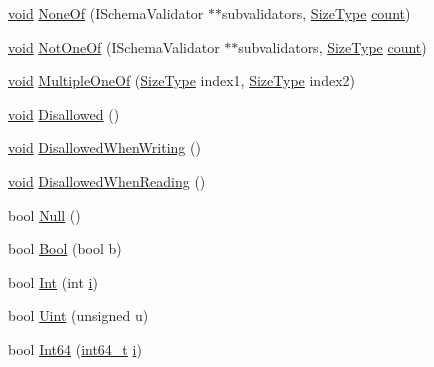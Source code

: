 \begin{DoxyCompactItemize}
\hyperlink{imgui__impl__opengl3__loader_8h_ac668e7cffd9e2e9cfee428b9b2f34fa7}{void} \hyperlink{classGenericSchemaValidator_aae9c45082721c650b91f8418cecc7293}{None\+Of} (I\+Schema\+Validator $\ast$$\ast$subvalidators, \hyperlink{rapidjson_8h_a5ed6e6e67250fadbd041127e6386dcb5}{Size\+Type} \hyperlink{imgui__impl__opengl3__loader_8h_a619bc20e8198de3bd3f3d7fc34de66b2}{count})
\item 
\hyperlink{imgui__impl__opengl3__loader_8h_ac668e7cffd9e2e9cfee428b9b2f34fa7}{void} \hyperlink{classGenericSchemaValidator_ad4819a91a42d781391760f26014cd315}{Not\+One\+Of} (I\+Schema\+Validator $\ast$$\ast$subvalidators, \hyperlink{rapidjson_8h_a5ed6e6e67250fadbd041127e6386dcb5}{Size\+Type} \hyperlink{imgui__impl__opengl3__loader_8h_a619bc20e8198de3bd3f3d7fc34de66b2}{count})
\item 
\hyperlink{imgui__impl__opengl3__loader_8h_ac668e7cffd9e2e9cfee428b9b2f34fa7}{void} \hyperlink{classGenericSchemaValidator_a53c37b0dba5f2ca79d2c7c13488e5ffd}{Multiple\+One\+Of} (\hyperlink{rapidjson_8h_a5ed6e6e67250fadbd041127e6386dcb5}{Size\+Type} index1, \hyperlink{rapidjson_8h_a5ed6e6e67250fadbd041127e6386dcb5}{Size\+Type} index2)
\item 
\hyperlink{imgui__impl__opengl3__loader_8h_ac668e7cffd9e2e9cfee428b9b2f34fa7}{void} \hyperlink{classGenericSchemaValidator_acc65a322086c792d6534e306c7a091cf}{Disallowed} ()
\item 
\hyperlink{imgui__impl__opengl3__loader_8h_ac668e7cffd9e2e9cfee428b9b2f34fa7}{void} \hyperlink{classGenericSchemaValidator_aa66173c9e71ed6143fa2b35ce777f36a}{Disallowed\+When\+Writing} ()
\item 
\hyperlink{imgui__impl__opengl3__loader_8h_ac668e7cffd9e2e9cfee428b9b2f34fa7}{void} \hyperlink{classGenericSchemaValidator_aa8bee0b3cbf45421151cf1b4040c4df7}{Disallowed\+When\+Reading} ()
\item 
bool \hyperlink{classGenericSchemaValidator_a7137af73e934f50c66cbb8a9aa802ea6}{Null} ()
\item 
bool \hyperlink{classGenericSchemaValidator_aa25fa7456f2f308a105e400f01a4afde}{Bool} (bool b)
\item 
bool \hyperlink{classGenericSchemaValidator_ad823c29990225661a4df69d34647b659}{Int} (int \hyperlink{game__play__state_8cpp_acb559820d9ca11295b4500f179ef6392}{i})
\item 
bool \hyperlink{classGenericSchemaValidator_aa688665c5274f93543c84a4b6cabe8da}{Uint} (unsigned u)
\item 
bool \hyperlink{classGenericSchemaValidator_ac5a9e416e18129a7b787f251019a828f}{Int64} (\hyperlink{stdint_8h_a414156feea104f8f75b4ed9e3121b2f6}{int64\+\_\+t} \hyperlink{game__play__state_8cpp_acb559820d9ca11295b4500f179ef6392}{i})

\end{DoxyCompactItemize}
